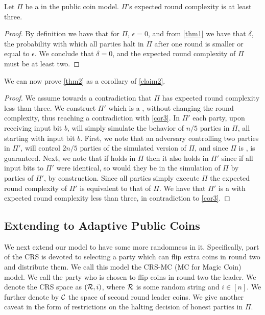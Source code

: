 
\begin{corollary}\label{cor3}
	Let $\Pi$ be a  in the public coin model. $\Pi$'s expected round complexity is at least three.
\end{corollary}

\begin{proof}
	By definition we have that for $\Pi$, $\epsilon = 0$, and from \cref{thm1} we have that $\delta$, the probability with which all parties halt in $\Pi$ after one round is smaller or equal to $\epsilon$. We conclude that $\delta = 0$, and the expected round complexity of $\Pi$ must be at least two.
\end{proof}

We can now prove \cref{thm2} as a corollary of \cref{claim2}.

\begin{proof}
	We assume towards a contradiction that $\Pi$ has expected round complexity less than three. We construct $\Pi'$ which is a , without changing the round complexity, thus reaching a contradiction with \cref{cor3}. In $\Pi'$ each party, upon receiving input bit $b$, will simply simulate the behavior of $n/5$ parties in $\Pi$, all starting with input bit $b$. First, we note that an adversary controlling two parties in $\Pi'$, will control $2n/5$ parties of the simulated version of $\Pi$, and since $\Pi$ is , \agr is guaranteed. Next, we note that if \val holds in $\Pi$ then it also holds in $\Pi'$ since if all input bits to $\Pi'$ were identical, so would they be in the simulation of $\Pi$ by parties of $\Pi'$, by construction. Since all parties simply execute $\Pi$ the expected round complexity of $\Pi'$ is equivalent to that of $\Pi$. We have that $\Pi'$ is a  with expected round complexity less than three, in contradiction to \cref{cor3}.
\end{proof}

\subsection{Extending to Adaptive Public Coins}

We next extend our model to have some more randomness in it. Specifically, part of the CRS is devoted to selecting a party which can flip extra coins in round two and distribute them. We call this model the CRS-MC (MC for Magic Coin) model. We call the party who is chosen to flip coins in round two the leader. We denote the CRS space as $(\mathcal{R},i)$, where $\mathcal{R}$ is some random string and $i \in [n]$. We further denote by $\mathcal{C}$ the space of second round leader coins. We give another caveat in the form of restrictions on the halting decision of honest parties in $\Pi$. 

